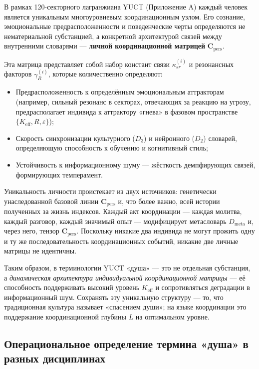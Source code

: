 \documentclass[12pt,a4paper]{article}
\begin{document}
	В рамках 120-секторного лагранжиана YUCT (Приложение A) каждый человек является уникальным многоуровневым координационным узлом. Его сознание, эмоциональные предрасположенности и поведенческие черты определяются не нематериальной субстанцией, а конкретной архитектурой связей между внутренними словарями — \textbf{личной координационной матрицей} \(\mathbf{C}_{\text{pers}}\).
	
	Эта матрица представляет собой набор констант связи \(\kappa_{sr}^{(i)}\) и резонансных факторов \(\gamma_{R}^{(i)}\), которые количественно определяют:
	\begin{itemize}
		\item Предрасположенность к определённым эмоциональным аттракторам (например, сильный резонанс в секторах, отвечающих за реакцию на угрозу, предрасполагает индивида к аттрактору «гнева» в фазовом пространстве \(\{K_{\mathrm{eff}}, R, \varepsilon\}\));
		\item Скорость синхронизации культурного (\(D_3\)) и нейронного (\(D_2\)) словарей, определяющую способность к обучению и когнитивный стиль;
		\item Устойчивость к информационному шуму — жёсткость демпфирующих связей, формирующих темперамент.
	\end{itemize}
	
	Уникальность личности проистекает из двух источников: генетически унаследованной базовой линии \(\mathbf{C}_{\text{pers}}\) и, что более важно, всей истории полученных за жизнь индексов. Каждый акт координации — каждая молитва, каждый разговор, каждый значимый опыт — модифицирует метасловарь \(D_{\text{meta}}\) и, через него, тензор \(\mathbf{C}_{\text{pers}}\). Поскольку никакие два индивида не могут прожить одну и ту же последовательность координационных событий, никакие две личные матрицы не идентичны.
	
	Таким образом, в терминологии YUCT «душа» — это не отдельная субстанция, а \emph{динамическая архитектура индивидуальной координационной матрицы} — её способность поддерживать высокий уровень \(K_{\mathrm{eff}}\) и сопротивляться деградации в информационный шум. Сохранять эту уникальную структуру — то, что традиционная культура называет «спасением души»; на языке координации это поддержание координационной глубины \(L\) на оптимальном уровне.
	
	\subsection{Операциональное определение термина «душа» в разных дисциплинах}
	\label{subsec:soul-definition}
	
\end{document}
